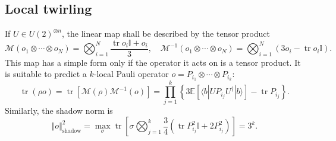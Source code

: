 \documentclass[aps,prb,superscriptaddress,nofootinbib]{revtex4}
\def \tr{\operatorname{tr}}
\begin{document}
\subsection{Local twirling}

If $U \in U(2)^{\otimes n}$, the linear map shall be described by the tensor product
\begin{equation}
	\mathcal{M}(o_1\otimes\cdots\otimes o_N) = \bigotimes_{i=1}^N \frac{\tr o_i\mathbb{I} + o_i}{3},\quad
	\mathcal{M}^{-1}(o_1\otimes\cdots\otimes o_N) = \bigotimes_{i=1}^N (3 o_i-\tr o_i\mathbb{I}).
\end{equation}
This map has a simple form only if the operator it acts on is a tensor product. It is suitable to predict a $k$-local Pauli operator $o = P_{i_1}\otimes\cdots\otimes P_{i_k}$:
\begin{equation}
	\tr(\rho o) = \tr[\mathcal{M}(\rho)\mathcal{M}^{-1}(o)]
	= \prod_{j=1}^k \left\{3\mathbb{E}\left[\langle b| U P_{i_j} U^\dagger |b\rangle\right] - \tr P_{i_j} \right\}.
\end{equation}
Similarly, the shadow norm is
\begin{equation}
	\Vert o \Vert_\text{shadow}^2 = \max_{\sigma} \tr\left[\sigma \bigotimes_{j=1}^k \frac{3}{4}\left(\tr P_{i_j}^2 \mathbb I+2 P_{i_j}^2 \right) \right]
	= 3^k.
\end{equation}
\end{document}
